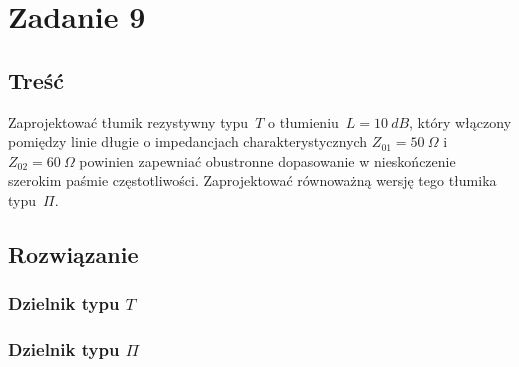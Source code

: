\documentclass[rep.tex]{subfiles}
\begin{document}
\chapter{Zadanie 9}
\label{zad9}
\section{Treść}
Zaprojektować tłumik rezystywny typu~$T$ o tłumieniu~$L = 10~dB$,
który włączony pomiędzy linie długie o impedancjach charakterystycznych $Z_{01} = 50~\Omega$ i $Z_{02} = 60~\Omega$
powinien zapewniać obustronne dopasowanie w nieskończenie szerokim paśmie częstotliwości.
Zaprojektować równoważną wersję tego tłumika typu~$\Pi$.

\section{Rozwiązanie}
\subsection{Dzielnik typu $T$}
\subsection{Dzielnik typu $\Pi$}
\end{document}
